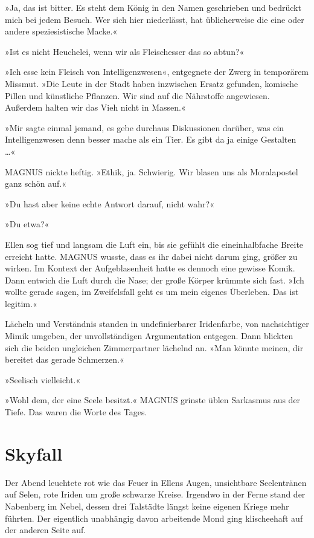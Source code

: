 »Ja, das ist bitter. Es steht dem König in den Namen geschrieben und bedrückt mich bei jedem Besuch. Wer sich hier niederlässt, hat üblicherweise die eine oder andere speziesistische Macke.«

»Ist es nicht Heuchelei, wenn wir als Fleischesser das so abtun?«

»Ich esse kein Fleisch von Intelligenzwesen«, entgegnete der Zwerg in temporärem Missmut. »Die Leute in der Stadt haben inzwischen Ersatz gefunden, komische Pillen und künstliche Pflanzen. Wir sind auf die Nährstoffe angewiesen. Außerdem halten wir das Vieh nicht in Massen.«

»Mir sagte einmal jemand, es gebe durchaus Diskussionen darüber, was ein Intelligenzwesen denn besser mache als ein Tier. Es gibt da ja einige Gestalten …«

MAGNUS nickte heftig. »Ethik, ja. Schwierig. Wir blasen uns als Moralapostel ganz schön auf.«

»Du hast aber keine echte Antwort darauf, nicht wahr?«

»Du etwa?«

Ellen sog tief und langsam die Luft ein, bis sie gefühlt die eineinhalbfache Breite erreicht hatte. MAGNUS wusste, dass es ihr dabei nicht darum ging, größer zu wirken. Im Kontext der Aufgeblasenheit hatte es dennoch eine gewisse Komik. Dann entwich die Luft durch die Nase; der große Körper krümmte sich fast. »Ich wollte gerade sagen, im Zweifelsfall geht es um mein eigenes Überleben. Das ist legitim.«

Lächeln und Verständnis standen in undefinierbarer Iridenfarbe, von nachsichtiger Mimik umgeben, der unvollständigen Argumentation entgegen. Dann blickten sich die beiden ungleichen Zimmerpartner lächelnd an. »Man könnte meinen, dir bereitet das gerade Schmerzen.«

»Seelisch vielleicht.«

»Wohl dem, der eine Seele besitzt.« MAGNUS grinste üblen Sarkasmus aus der Tiefe. Das waren die Worte des Tages.


\chapter{Skyfall}

Der Abend leuchtete rot wie das Feuer in Ellens Augen, unsichtbare Seelentränen auf Selen, rote Iriden um große schwarze Kreise. Irgendwo in der Ferne stand der Nabenberg im Nebel, dessen drei Talstädte längst keine eigenen Kriege mehr führten. Der eigentlich unabhängig davon arbeitende Mond ging klischeehaft auf der anderen Seite auf.

